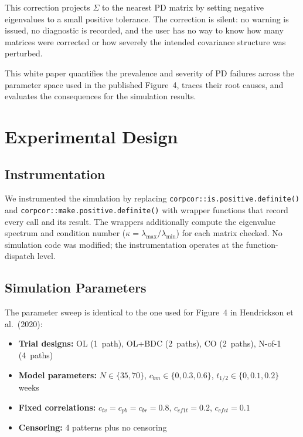 \documentclass[11pt]{article}
\begin{document}
This correction projects $\Sigma$ to the nearest PD matrix by
setting negative eigenvalues to a small positive tolerance. The
correction is silent: no warning is issued, no diagnostic is
recorded, and the user has no way to know how many matrices
were corrected or how severely the intended covariance structure
was perturbed.

This white paper quantifies the prevalence and severity of PD
failures across the parameter space used in the published
Figure~4, traces their root causes, and evaluates the
consequences for the simulation results.

\section{Experimental Design}

\subsection{Instrumentation}

We instrumented the simulation by replacing
\texttt{corpcor::is.positive.definite()} and
\texttt{corpcor::make.positive.definite()} with wrapper
functions that record every call and its result. The wrappers
additionally compute the eigenvalue spectrum and condition
number ($\kappa = \lambda_{\max} / \lambda_{\min}$) for each
matrix checked. No simulation code was modified; the
instrumentation operates at the function-dispatch level.

\subsection{Simulation Parameters}

The parameter sweep is identical to the one used for Figure~4 in
Hendrickson et al.\ (2020):

\begin{itemize}[nosep]
\item \textbf{Trial designs:} OL (1~path), OL+BDC (2~paths),
  CO (2~paths), N-of-1 (4~paths)
\item \textbf{Model parameters:}
  $N \in \{35, 70\}$,
  $c_{bm} \in \{0, 0.3, 0.6\}$,
  $t_{1/2} \in \{0, 0.1, 0.2\}$ weeks
\item \textbf{Fixed correlations:}
  $c_{tv} = c_{pb} = c_{br} = 0.8$,
  $c_{cf1t} = 0.2$,
  $c_{cfct} = 0.1$
\item \textbf{Censoring:} 4 patterns plus no censoring
\end{itemize}
\end{document}
